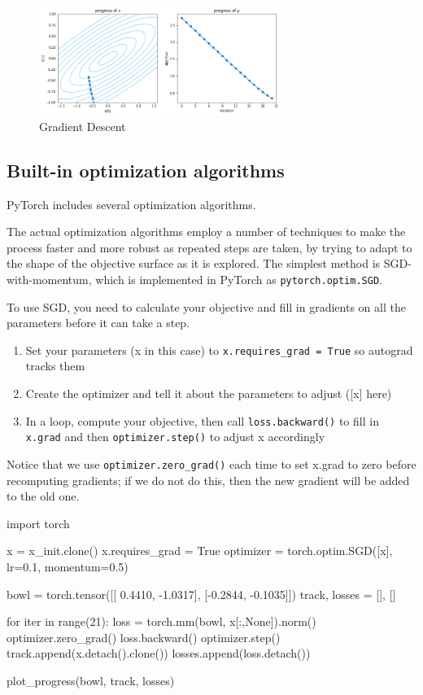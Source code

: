 \begin{figure}[H]
    \centering
    \includegraphics[width=0.7\textwidth]{assets/fig6.png}
    \caption{Gradient Descent}
\end{figure}

\subsection{Built-in optimization algorithms}

PyTorch includes several optimization algorithms. 

The actual optimization algorithms employ a number of techniques to make the process faster and more robust as repeated steps are taken, by trying to adapt to the shape of the objective surface as it is explored. The simplest method is SGD-with-momentum, which is implemented in PyTorch as \texttt{pytorch.optim.SGD}.

To use SGD, you need to calculate your objective and fill in gradients on all the parameters before it can take a step. 
\begin{enumerate}
    \item Set your parameters (x in this case) to \texttt{x.requires\_grad = True} so autograd tracks them
    \item Create the optimizer and tell it about the parameters to adjust ([x] here)
    \item In a loop, compute your objective, then call \texttt{loss.backward()} to fill in \texttt{x.grad} and then \texttt{optimizer.step()} to adjust x accordingly
\end{enumerate}

Notice that we use \texttt{optimizer.zero\_grad()} each time to set x.grad to zero before recomputing gradients; if we do not do this, then the new gradient will be added to the old one. 

\begin{exampleblock}[SGD]
    \begin{codeblock}[language=python]
import torch

x = x_init.clone()
x.requires_grad = True
optimizer = torch.optim.SGD([x], lr=0.1, momentum=0.5)

bowl = torch.tensor([[ 0.4410, -1.0317], [-0.2844, -0.1035]])
track, losses = [], []

for iter in range(21):
    loss = torch.mm(bowl, x[:,None]).norm()
    optimizer.zero_grad()
    loss.backward()
    optimizer.step()
    track.append(x.detach().clone())
    losses.append(loss.detach())
    
plot_progress(bowl, track, losses)
    \end{codeblock}
\end{exampleblock}

